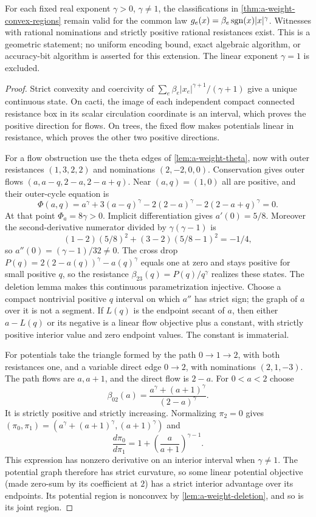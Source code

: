 \begin{theorem}
\label{thm:a-weight-power-regions}
For each fixed real exponent $\gamma>0$, $\gamma\ne1$, the classifications
in \cref{thm:a-weight-convex-regions} remain valid for the common law
$g_e(x)=\beta_e\operatorname{sgn}(x)|x|^\gamma$. Witnesses with rational nominations
and strictly positive rational resistances exist. This is a geometric
statement; no uniform encoding bound, exact algebraic algorithm, or
accuracy-bit algorithm is asserted for this extension. The linear
exponent $\gamma=1$ is excluded.
\end{theorem}
\begin{proof}
Strict convexity and coercivity of
$\sum_e\beta_e|x_e|^{\gamma+1}/(\gamma+1)$ give a unique continuous
state. On cacti, the image of each independent compact connected
resistance box in its scalar circulation coordinate is an interval,
which proves the positive direction for flows. On trees, the fixed flow
makes potentials linear in resistance, which proves the other two
positive directions.

For a flow obstruction use the theta edges of
\cref{lem:a-weight-theta}, now with outer resistances $(1,3,2,2)$ and
nominations $(2,-2,0,0)$. Conservation gives outer flows
$(a,a-q,2-a,2-a+q)$. Near $(a,q)=(1,0)$ all are positive, and their
outer-cycle equation is
\[
 \Phi(a,q)=a^\gamma+3(a-q)^\gamma
               -2(2-a)^\gamma-2(2-a+q)^\gamma=0.
\]
At that point $\Phi_a=8\gamma>0$. Implicit differentiation gives
$a'(0)=5/8$. Moreover the second-derivative numerator divided by
$\gamma(\gamma-1)$ is
\[
 (1-2)(5/8)^2+(3-2)(5/8-1)^2=-1/4,
\]
so $a''(0)=(\gamma-1)/32\ne0$.
The cross drop $P(q)=2(2-a(q))^\gamma-a(q)^\gamma$ equals one at zero
and stays positive for small positive $q$, so the resistance
$\beta_{23}(q)=P(q)/q^\gamma$ realizes these states.
The deletion lemma makes this continuous parametrization injective.
Choose a compact nontrivial positive $q$ interval on which $a''$ has
strict sign; the graph of $a$ over it is not a segment. If $L(q)$ is the
endpoint secant of $a$, then either $a-L(q)$ or its negative is a linear
flow objective plus a constant, with strictly positive interior value and
zero endpoint values. The constant is immaterial.

For potentials take the triangle formed by the path $0\to1\to2$, with
both resistances one, and a variable direct edge $0\to2$, with
nominations $(2,1,-3)$. The path flows are $a,a+1$, and the direct flow
is $2-a$. For $0<a<2$ choose
\[
 \beta_{02}(a)=\frac{a^\gamma+(a+1)^\gamma}{(2-a)^\gamma}.
\]
It is strictly positive and strictly increasing. Normalizing $\pi_2=0$
gives $(\pi_0,\pi_1)=(a^\gamma+(a+1)^\gamma,(a+1)^\gamma)$ and
\[
 \frac{d\pi_0}{d\pi_1}
   =1+\left(\frac a{a+1}\right)^{\gamma-1}.
\]
This expression has nonzero derivative on an interior interval when
$\gamma\ne1$. The potential graph therefore has strict curvature, so some
linear potential objective (made zero-sum by its coefficient at $2$) has
a strict interior advantage over its endpoints. Its potential region is
nonconvex by \cref{lem:a-weight-deletion}, and so is its joint region.


\end{proof}
